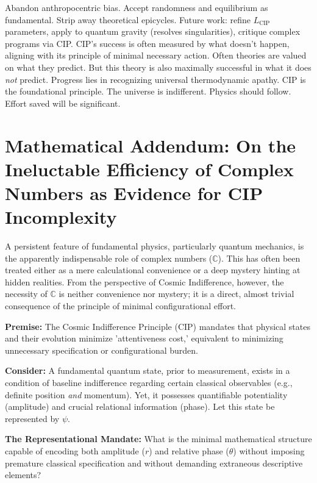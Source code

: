 \documentclass[11pt, a4paper]{article}
\newcommand{\subt}[1]{\mathrm{#1}}
\begin{document}
{{{Abandon anthropocentric bias. Accept randomness and equilibrium as fundamental. Strip away theoretical epicycles. Future work: refine $L_{\subt{CIP}}$ parameters, apply to quantum gravity (resolves singularities), critique complex programs via CIP.
CIP's success is often measured by what doesn't happen, aligning with its principle of minimal necessary action. Often theories are valued on what they predict. But this theory is also maximally successful in what it does \textit{not} predict.
Progress lies in recognizing universal thermodynamic apathy. CIP is the foundational principle. The universe is indifferent. Physics should follow. Effort saved will be significant.

\clearpage

\appendix %
\section{Mathematical Addendum: On the Ineluctable Efficiency of Complex Numbers as Evidence for CIP Incomplexity}

A persistent feature of fundamental physics, particularly quantum mechanics, is the apparently indispensable role of complex numbers ($\mathbb{C}$). This has often been treated either as a mere calculational convenience or a deep mystery hinting at hidden realities. From the perspective of Cosmic Indifference, however, the necessity of $\mathbb{C}$ is neither convenience nor mystery; it is a direct, almost trivial consequence of the principle of minimal configurational effort.

\textbf{Premise:} The Cosmic Indifference Principle (CIP) mandates that physical states and their evolution minimize 'attentiveness cost,' equivalent to minimizing unnecessary specification or configurational burden.

\textbf{Consider:} A fundamental quantum state, prior to measurement, exists in a condition of baseline indifference regarding certain classical observables (e.g., definite position \textit{and} momentum). Yet, it possesses quantifiable potentiality (amplitude) and crucial relational information (phase). Let this state be represented by $\psi$.

\textbf{The Representational Mandate:} What is the minimal mathematical structure capable of encoding both amplitude ($r$) and relative phase ($\theta$) without imposing premature classical specification and without demanding extraneous descriptive elements?

}}}
\end{document}
